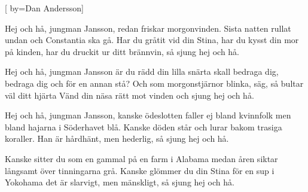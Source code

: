 


[ 	%
	by={Dan Andersson}]		%
	
\beginverse*		%
Hej och hå, jungman Jansson,
redan friskar morgonvinden.
Sista natten rullat undan och 
Constantia ska gå.
Har du gråtit vid din Stina,
har du kysst din mor på kinden,
har du druckit ur ditt brännvin,
så sjung hej och hå.
\endverse			%

\beginverse*		%
Hej och hå, jungman Jansson är du rädd din lilla snärta
skall bedraga dig, bedraga dig och för en annan stå?
Och som morgonstjärnor blinka, säg, så bultar väl ditt hjärta
Vänd din näsa rätt mot vinden och sjung hej och hå.
\endverse			%

\beginverse*		%
Hej och hå, jungman Jansson, kanske ödeslotten faller
ej bland kvinnfolk men bland hajarna i Söderhavet blå.
Kanske döden står och lurar bakom trasiga koraller.
Han är hårdhänt, men hederlig, så sjung hej och hå.
\endverse			%

\beginverse*		%
Kanske sitter du som en gammal på en farm i Alabama
medan åren siktar långsamt över tinningarna grå.
Kanske glömmer du din Stina för en sup i Yokohama
det är slarvigt, men mänskligt, så sjung hej och hå.
\endverse			%
\endsong			%

